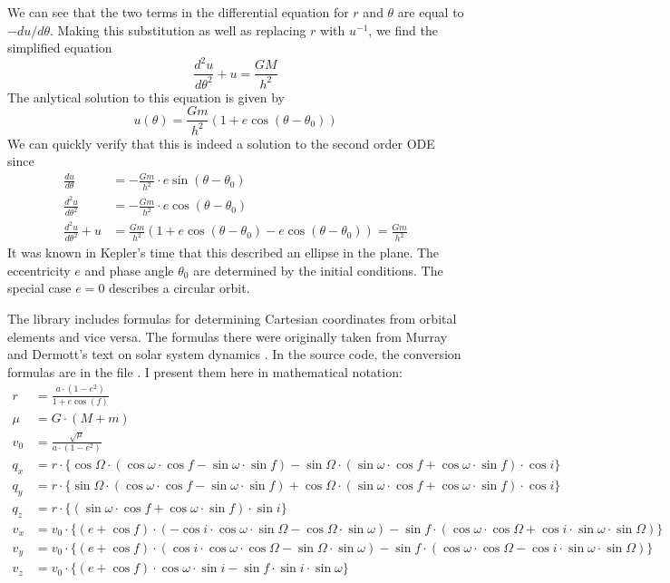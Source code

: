 We can see that the two terms in the differential equation for $r$ and $\theta$ are equal to $-du / d\theta$.
Making this substitution as well as replacing $r$ with $u^{-1}$, we find the simplified equation
$$ \frac{d^2u}{d\theta^2} + u = \frac{GM}{h^2}$$
The anlytical solution to this equation is given by
$$u(\theta) = \frac{Gm}{h^2} \left(1 + e \cos(\theta - \theta_0) \right)$$
We can quickly verify that this is indeed a solution to the second order ODE since
\begin{align*}
\frac{du}{d\theta} &= -\frac{Gm}{h^2} \cdot e \sin(\theta - \theta_0) \\
\frac{d^2u}{d\theta^2} &= -\frac{Gm}{h^2} \cdot e \cos(\theta - \theta_0) \\
\frac{d^2u}{d\theta^2} + u &= \frac{Gm}{h^2} \left( 1 + e \cos(\theta-\theta_0) - e \cos(\theta - \theta_0) \right) = \frac{Gm}{h^2}
\end{align*}
It was known in Kepler's time that this described an ellipse in the plane.
The eccentricity $e$ and phase angle $\theta_0$ are determined by the initial conditions.
The special case $e=0$ describes a circular orbit.

The  library includes formulas for determining Cartesian coordinates from orbital elements and vice versa.
The formulas there were originally taken from Murray and Dermott's text on solar system dynamics \cite{SSD}.
In the  source code, the conversion formulas are in the file .
I present them here in mathematical notation:
\begin{align*}
r &= \frac{a \cdot (1 - e^2) }{1 + e \cos (f) } \\
\mu &= G \cdot (M + m) \\
v_0 &= \frac{\sqrt{ \mu}}{{a \cdot (1 - e^2)}} \\
q_x &= r \cdot \lbrace 
\cos \Omega \cdot (\cos \omega \cdot \cos f - \sin \omega \cdot \sin f) - 
\sin \Omega \cdot (\sin \omega \cdot \cos f +\cos \omega \cdot \sin f ) 
\cdot \cos i \rbrace \\
q_y &= r \cdot \lbrace 
\sin \Omega \cdot (\cos \omega \cdot \cos f - \sin \omega \cdot \sin f) + 
\cos \Omega \cdot (\sin \omega \cdot \cos f +\cos \omega \cdot \sin f )
 \cdot \cos i \rbrace \\
q_z &= r \cdot \lbrace (\sin \omega \cdot \cos f + \cos \omega \cdot \sin f) \cdot \sin i \rbrace \\
v_x &= v_0 \cdot \lbrace 
(e + \cos f) 
\cdot (-\cos i \cdot \cos \omega \cdot \sin \Omega - \cos \Omega \cdot \sin \omega) - 
\sin f \cdot  (\cos \omega \cdot \cos \Omega + \cos i \cdot \sin \omega \cdot \sin \Omega) 
\rbrace \\
v_y &= v_0 \cdot \lbrace 
(e + \cos f) 
\cdot (\cos i \cdot \cos \omega \cdot \cos \Omega - \sin \Omega \cdot \sin \omega) - 
\sin f \cdot  (\cos \omega \cdot \cos \Omega - \cos i \cdot \sin \omega \cdot \sin \Omega) 
\rbrace \\
v_z &= v_0 \cdot \lbrace 
(e + \cos f) \cdot \cos \omega \cdot \sin i - \sin f \cdot \sin i \cdot \sin \omega
\rbrace
\end{align*}

